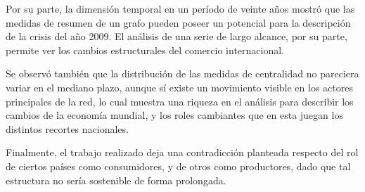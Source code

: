 \documentclass[class=article, crop=false]{standalone}
\begin{document}
Por su parte, la dimensión temporal en un período de veinte años mostró que las medidas de resumen de un grafo pueden poseer un potencial para la descripción de la crisis del año 2009. El análisis de una serie de largo alcance, por su parte, permite ver los cambios estructurales del comercio internacional.            

Se observó también que la distribución de las medidas de centralidad no pareciera variar en el mediano plazo, aunque sí existe un movimiento visible en los actores principales de la red, lo cual muestra una riqueza en el análisis para describir los cambios de la economía mundial, y los roles cambiantes que en esta juegan los distintos recortes nacionales. 

Finalmente, el trabajo realizado deja una contradicción planteada respecto del rol de ciertos países como consumidores, y de otros como productores, dado que tal estructura no sería sostenible de forma prolongada.


%
%
%
\end{document}
